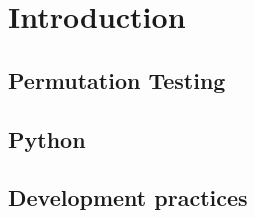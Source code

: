 \chapter{Introduction}

\section{Permutation Testing}

\section{Python}

\cite{millman2011python, Perez2011}


\section{Development practices}

\cite{millman2014}

